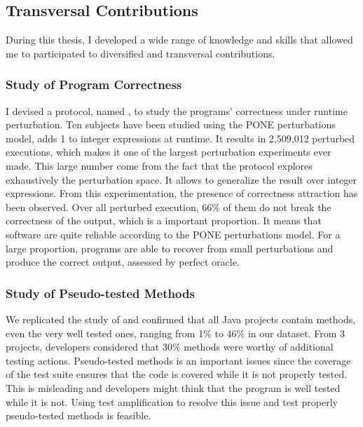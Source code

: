 \subsection{Transversal Contributions}
\label{subsec:conclusion:contributions-summary:transversal-contributions}

During this thesis, I developed a wide range of knowledge and skills that allowed me to participated to diversified and transversal contributions.

\subsubsection{Study of Program Correctness}
\label{subsubsec:conclusion:contributions-summary:transversal-contributions:correctness-attraction}

I devised a protocol, named \perturb, to study the programs' correctness under runtime perturbation.
Ten subjects have been studied using the PONE perturbations model, \ie adds 1 to integer expressions at runtime.
It results in 2,509,012 perturbed executions, which makes it one of the largest perturbation experiments ever made.
This large number come from the fact that the protocol explores exhaustively the perturbation space.
It allows to generalize the result over integer expressions.
From this experimentation, the presence of correctness attraction has been observed. 
Over all perturbed execution, 66\% of them do not break the correctness of the output, which is a important proportion. 
It means that software are quite reliable according to the PONE perturbations model.
For a large proportion, programs are able to recover from small perturbations and produce the correct output, assessed by perfect oracle.

\subsubsection{Study of Pseudo-tested Methods}
\label{subsubsec:conclusion:contributions-summary:transversal-contributions:pseudo-tested}

We replicated the study of \theoriginalauthors{} and confirmed that all Java projects contain \pseudotested{} methods, even the very well tested ones, ranging from 1\% to 46\% in our dataset.
From 3 projects, developers considered that 30\% methods were worthy of additional testing actions.
Pseudo-tested methods is an important issues since the coverage of the test suite ensures that the code is covered while it is not properly tested.
This is misleading and developers might think that the program is well tested while it is not.
Using test amplification to resolve this issue and test properly pseudo-tested methods is feasible.

